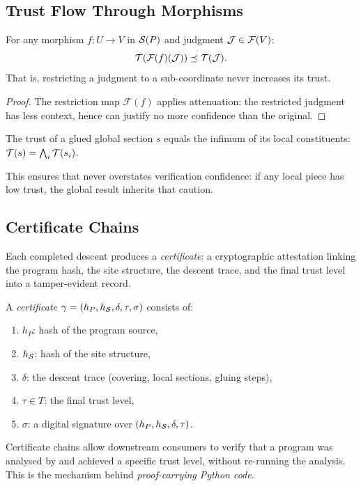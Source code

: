 \subsection{Trust Flow Through Morphisms}\label{subsec:trust-flow}

\begin{proposition}
For any morphism $f: U \to V$ in $\mathcal{S}(P)$ and judgment $\mathcal{J} \in \mathcal{F}(V)$:
\[
  \mathcal{T}(\mathcal{F}(f)(\mathcal{J})) \preceq \mathcal{T}(\mathcal{J}).
\]
That is, restricting a judgment to a sub-coordinate never increases its trust.
\end{proposition}

\begin{proof}
The restriction map $\mathcal{F}(f)$ applies attenuation:
the restricted judgment has less context, hence can justify no more
confidence than the original.
\end{proof}

\begin{proposition}
The trust of a glued global section $s$ equals the infimum of its
local constituents:
$\mathcal{T}(s) = \bigwedge_{i} \mathcal{T}(s_i)$.
\end{proposition}

This ensures that \JuGeo{} never overstates verification confidence:
if any local piece has low trust, the global result inherits that caution.

\subsection{Certificate Chains}\label{subsec:certificates}

Each completed descent produces a \emph{certificate}: a cryptographic
attestation linking the program hash, the site structure, the descent
trace, and the final trust level into a tamper-evident record.

\begin{definition}[Certificate]\label{def:certificate}
A \emph{certificate} $\gamma = (h_P, h_{\mathcal{S}}, \delta, \tau, \sigma)$
consists of:
\begin{enumerate}
  \item $h_P$: hash of the program source,
  \item $h_{\mathcal{S}}$: hash of the site structure,
  \item $\delta$: the descent trace (covering, local sections, gluing steps),
  \item $\tau \in T$: the final trust level,
  \item $\sigma$: a digital signature over $(h_P, h_{\mathcal{S}}, \delta, \tau)$.
\end{enumerate}
\end{definition}

Certificate chains allow downstream consumers to verify that a program
was analysed by \JuGeo{} and achieved a specific trust level, without
re-running the analysis.  This is the mechanism behind
\emph{proof-carrying Python code}.
